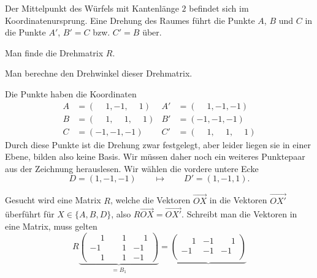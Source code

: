 Der Mittelpunkt des Würfels mit Kantenlänge $2$ befindet sich im
Koordinatenursprung.
Eine Drehung des Raumes führt die Punkte $A$, $B$ und $C$ in
die Punkte $A'$, $B'=C$ bzw. $C'=B$ über.

\begin{center}
\end{center}

\begin{teilaufgaben}
\item
Man finde die Drehmatrix $R$.
\item
Man berechne den Drehwinkel dieser Drehmatrix.
\end{teilaufgaben}


\begin{loesung}
Die Punkte haben die Koordinaten
\begin{align*}
A&=(\phantom{-}1,         - 1,\phantom{-}1)
			&A'&=(\phantom{-}1,         - 1,         - 1)\\
B&=(\phantom{-}1,\phantom{-}1,\phantom{-}1)
			&B'&=(         - 1,         - 1,         - 1)\\
C&=(         - 1,         - 1,         - 1)
			&C'&=(\phantom{-}1,\phantom{-}1,\phantom{-}1)
\end{align*}
Durch diese Punkte ist die Drehung zwar festgelegt, aber leider liegen
sie in einer Ebene, bilden also keine Basis.
Wir müssen daher noch ein weiteres Punktepaar aus der Zeichnung
herauslesen.
Wir wählen die vordere untere Ecke
\[
D=(1,-1,-1) \qquad\mapsto\qquad D'=(1,-1,1).
\]
\begin{teilaufgaben}
\item
Gesucht wird eine Matrix $R$, welche die Vektoren $\overrightarrow{OX}$
in die Vektoren $\overrightarrow{OX'}$ überführt für $X\in\{A,B,D\}$,
also $R\overrightarrow{OX}=\overrightarrow{OX'}$.
Schreibt man die Vektoren in eine Matrix, muss gelten
\[
R
\underbrace{
\begin{pmatrix}
\phantom{-}1&\phantom{-}1&\phantom{-}1\\
         - 1&\phantom{-}1&         - 1\\
\phantom{-}1&\phantom{-}1&         - 1
\end{pmatrix}}_{\displaystyle =B_1}
=
\underbrace{
\begin{pmatrix}
\phantom{-}1&-1&\phantom{-}1\\
         - 1&-1&         - 1\\

\end{pmatrix}}\]
\end{teilaufgaben}
\end{loesung}
